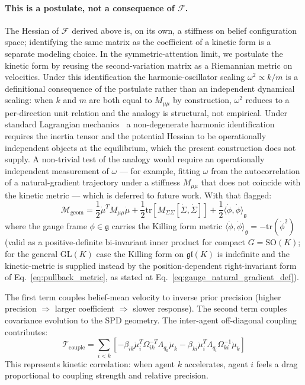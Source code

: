 \documentclass[11pt]{article}
\begin{document}
\paragraph{This is a postulate, not a consequence of $\mathcal{F}$.} The Hessian of $\mathcal{F}$ derived above is, on its own, a stiffness on belief configuration space; identifying the same matrix as the coefficient of a kinetic form is a separate modeling choice. In the symmetric-attention limit, we postulate the kinetic form by reusing the second-variation matrix as a Riemannian metric on velocities. Under this identification the harmonic-oscillator scaling $\omega^2 \propto k/m$ is a definitional consequence of the postulate rather than an independent dynamical scaling: when $k$ and $m$ are both equal to $M_{\mu\mu}$ by construction, $\omega^2$ reduces to a per-direction unit relation and the analogy is structural, not empirical. Under standard Lagrangian mechanics~\cite{arnold1989mathematical} a non-degenerate harmonic identification requires the inertia tensor and the potential Hessian to be operationally independent objects at the equilibrium, which the present construction does not supply. A non-trivial test of the analogy would require an operationally independent measurement of $\omega$ — for example, fitting $\omega$ from the autocorrelation of a natural-gradient trajectory under a stiffness $M_{\mu\mu}$ that does not coincide with the kinetic metric — which is deferred to future work. With that flagged:
\begin{equation}
\mathcal{M}_{\text{geom}} = \frac{1}{2}\dot{\mu}^T M_{\mu\mu} \dot{\mu} + \frac{1}{2}\mathrm{tr}\left[M_{\Sigma\Sigma}[\dot{\Sigma}, \dot{\Sigma}]\right] + \frac{1}{2}\langle\dot{\phi}, \dot{\phi}\rangle_{\mathfrak{g}}
\label{eq:full_kinetic}
\end{equation}
where the gauge frame $\phi \in \mathfrak{g}$ carries the Killing form metric $\langle \dot{\phi}, \dot{\phi} \rangle_{\mathfrak{g}} = -\mathrm{tr}(\dot{\phi}^2)$ (valid as a positive-definite bi-invariant inner product for compact $G = \mathrm{SO}(K)$; for the general $\mathrm{GL}(K)$ case the Killing form on $\mathfrak{gl}(K)$ is indefinite and the kinetic-metric is supplied instead by the position-dependent right-invariant form of Eq.~\eqref{eq:pullback_metric}, as stated at Eq.~\eqref{eq:gauge_natural_gradient_def}).

The first term couples belief-mean velocity to inverse prior precision (higher precision $\Rightarrow$ larger coefficient $\Rightarrow$ slower response). The second term couples covariance evolution to the SPD geometry. The inter-agent off-diagonal coupling contributes:
\begin{equation}
\mathcal{T}_{\mathrm{couple}} = \sum_{i < k}\left[-\beta_{ik}\dot{\mu}_i^T \Omega_{ik}^{-T}\Lambda_{q_k}\dot{\mu}_k - \beta_{ki}\dot{\mu}_i^T \Lambda_{q_i}\Omega_{ki}^{-1} \dot{\mu}_k\right]
\end{equation}
This represents kinetic correlation: when agent $k$ accelerates, agent $i$ feels a drag proportional to coupling strength and relative precision.
\end{document}
